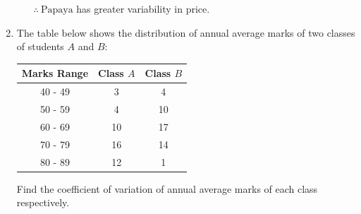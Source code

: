 \documentclass{report}
\begin{document}
\begin{multicols}{2}
\begin{enumerate}
\begin{enumerate}
                  $\therefore\ \text{Papaya}$ has greater variability in price.
          \end{enumerate}

    \item The table below shows the distribution of annual average marks of two classes
          of students $A$ and $B$:
          \begin{center}
            \begin{tabular}{|c|c|c|}
              \hline
              Marks Range & Class $A$ & Class $B$ \\
              \hline
              40 - 49     & 3         & 4         \\
              50 - 59     & 4         & 10        \\
              60 - 69     & 10        & 17        \\
              70 - 79     & 16        & 14        \\
              80 - 89     & 12        & 1         \\
              \hline
            \end{tabular}
          \end{center}
          Find the coefficient of variation of annual average marks of each class respectively.
          \sol{}


\end{enumerate}
\end{multicols}
\end{document}
